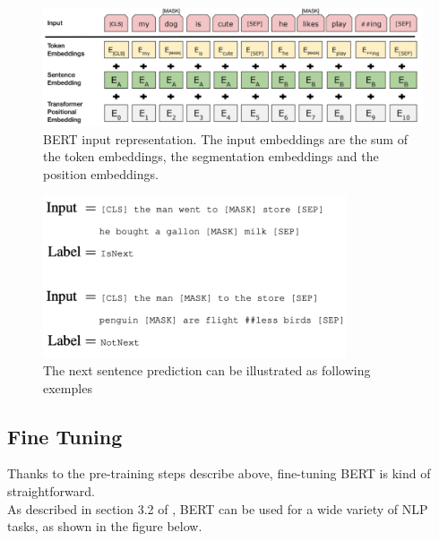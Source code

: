 \begin{figure}[h]
    \centering
    \includegraphics[width=1\textwidth]{NSP.png}
    \caption{BERT \cite{Devlin2018} input representation. The input embeddings are the sum of the token embeddings, the segmentation embeddings and the position embeddings.}
    \label{fig:NSP1}
\end{figure}

\begin{figure}[h]
    \centering
    \includegraphics[width=0.8\textwidth]{NSP2.png}
    \caption{The next sentence prediction can be illustrated as following exemples \cite{Devlin2018}}
    \label{fig:NSP2}
\end{figure}

\clearpage
\subsection{Fine Tuning}
Thanks to the pre-training steps describe above, fine-tuning BERT is kind of straightforward. \\
As described in section 3.2 of \citeauthor{Devlin2018}, BERT can be used for a wide variety of NLP tasks, as shown in the figure below.

